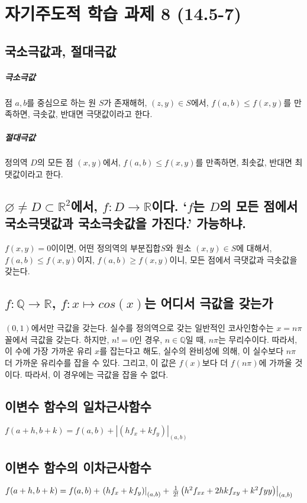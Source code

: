 \chapter{자기주도적 학습 과제 8 (14.5-7)}
\section{국소극값과, 절대극값}
\paragraph{극소극값}
점 $a,b$를 중심으로 하는 원 $S$가 존재해허, $(z,y) \in S$에서,  $f(a,b) \le f(x,y)$를 만족하면, 극솟값, 반대면 극댓값이라고 한다.

\paragraph{절대극값}
정의역 $D$의 모든 점 $(x,y)$에서,  $f(a,b) \le f(x,y)$를 만족하면, 최솟값, 반대면 최댓값이라고 한다.
\section{$\varnothing \ne D \subset \mathbb{R}^2 $에서, $f: D \to \mathbb{R}$이다. `$f$는 $D$의 모든 점에서 국소극댓값과 국소극솟값을 가진다.' 가능하냐.}
$f(x,y)=0$이이면, 어떤 정의역의 부분집합$S$와 원소 $(x,y) \in S$에 대해서, $f(a,b) \le f(x,y)$이지, $f(a,b) \ge f(x,y)$이니, 모든 점에서 극댓값과 극솟값을 갖는다.

\section{$f: \mathbb{Q} \to \mathbb{R}$, $f: x \mapsto cos (x)$는 어디서 극값을 갖는가}
$(0,1)$에서만 극값을 갖는다. 실수를 정의역으로 갖는 일반적인 코사인함수는 $x=n \pi$꼴에서 극값을 갖는다. 하지만, $n!=0$인 경우, $n \in \mathbb{Q}$일 때, $n \pi$는 무리수이다.
따라서, 이 수에 가장 가까운 유리 $x$를 잡는다고 해도, 실수의 완비성에 의해, 이 실수보다 $n \pi$더 가까운 유리수를 잡을 수 있다. 그리고, 이 값은 $f(x)$보다 더 $f(n\pi)$에 가까울 것이다. 따라서, 이 경우에는 극값을 잡을 수 없다.

\section{이변수 함수의 일차근사함수}
$f(a+h, b+k) = f(a,b) +  \left| \left(hf_x + kf_y\right)\right|_{(a,b)}$

\section{이변수 함수의 이차근사함수}
$f(a+h, b+k) = f(a,b) +  \left.\left(hf_x + kf_y\right)\right|_{(a,b)} +   \left.{{1} \over {2!}} \left(h^2 f_{xx} + 2hk f_{xy}+ k^2 f{yy}\right) \right|_{(a,b)}$